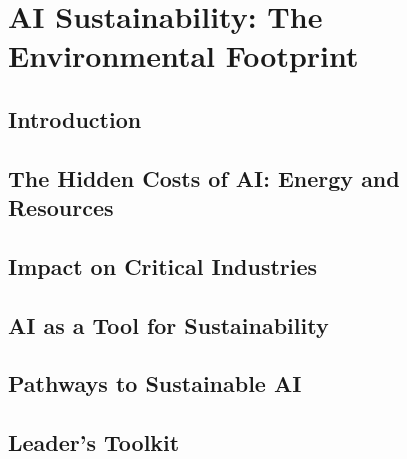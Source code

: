 \chapter{AI Sustainability: The Environmental Footprint}
\label{chap:ai_sustainability}

\section{Introduction}
\label{sec:sustainability_introduction}

\section{The Hidden Costs of AI: Energy and Resources}
\label{sec:hidden_costs_of_ai}

\section{Impact on Critical Industries}
\label{sec:sustainability_impact}

\section{AI as a Tool for Sustainability}
\label{sec:ai_for_sustainability}

\section{Pathways to Sustainable AI}
\label{sec:sustainable_ai_pathways}

\section{Leader's Toolkit}
\label{sec:sustainability_leaders_toolkit}